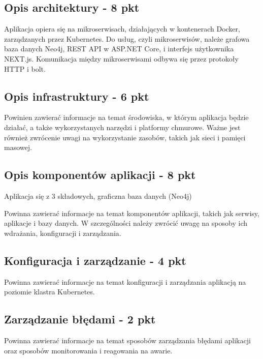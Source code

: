 \documentclass[12pt,a4paper]{article}
\begin{document}
\subsection{Opis architektury - 8 pkt}
\label{sec:introduction}

Aplikacja opiera się na mikroserwisach, działających w kontenerach Docker, zarządzanych przez Kubernetes. Do usług, czyli mikroserwisów, należe grafowa baza danych Neo4j, REST API w ASP.NET Core, i interfejs użytkownika NEXT.js. Komunikacja między mikroserwisami odbywa się przez protokoły HTTP i bolt.



\subsection{Opis infrastruktury - 6 pkt}
\label{sec:Users}

Powinien zawierać informacje na temat środowiska, w którym aplikacja będzie działać, a także wykorzystanych narzędzi i platformy chmurowe. Ważne jest również zwrócenie uwagi na wykorzystanie zasobów, takich jak sieci i pamięci masowej.

\subsection{Opis komponentów aplikacji - 8 pkt}
\label{sec:FunctionalConditions}

Aplikacja się z 3 składowych, graficzna baza danych (Neo4j) 

Powinna zawierać informacje na temat komponentów aplikacji, takich jak serwisy, aplikacje i bazy danych. W szczególności należy zwrócić uwagę na sposoby ich wdrażania, konfiguracji i zarządzania.

\subsection{Konfiguracja i zarządzanie - 4 pkt}
\label{sec:NonFunctionalConditions}

Powinna zawierać informacje na temat konfiguracji i zarządzania aplikacją na poziomie klastra Kubernetes.

\subsection{Zarządzanie błędami - 2 pkt}
\label{sec:ERD} 

Powinna zawierać informacje na temat sposobów zarządzania błędami aplikacji oraz sposobów monitorowania i reagowania na awarie.
\end{document}
